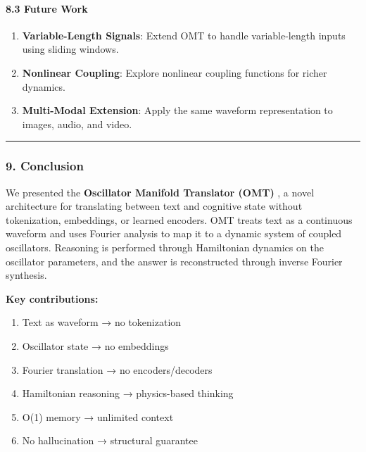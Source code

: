 \documentclass[
  11pt,
  a4paper,
]{article}
\providecommand{\tightlist}{%
  \setlength{\itemsep}{0pt}\setlength{\parskip}{0pt}}
\begin{document}
\paragraph{8.3 Future Work}\label{future-work-2}

\begin{enumerate}
\def\labelenumi{\arabic{enumi}.}
\tightlist
\item
  \textbf{Variable-Length Signals}: Extend OMT to handle variable-length
  inputs using sliding windows.
\item
  \textbf{Nonlinear Coupling}: Explore nonlinear coupling functions for
  richer dynamics.
\item
  \textbf{Multi-Modal Extension}: Apply the same waveform representation
  to images, audio, and video.
\end{enumerate}

\begin{center}\rule{0.5\linewidth}{0.5pt}\end{center}

\subsubsection{9. Conclusion}\label{conclusion-6}

We presented the \textbf{Oscillator Manifold Translator (OMT)} , a novel
architecture for translating between text and cognitive state without
tokenization, embeddings, or learned encoders. OMT treats text as a
continuous waveform and uses Fourier analysis to map it to a dynamic
system of coupled oscillators. Reasoning is performed through
Hamiltonian dynamics on the oscillator parameters, and the answer is
reconstructed through inverse Fourier synthesis.

\textbf{Key contributions:}

\begin{enumerate}
\def\labelenumi{\arabic{enumi}.}
\tightlist
\item
  Text as waveform → no tokenization
\item
  Oscillator state → no embeddings
\item
  Fourier translation → no encoders/decoders
\item
  Hamiltonian reasoning → physics-based thinking
\item
  O(1) memory → unlimited context
\item
  No hallucination → structural guarantee
\end{enumerate}
\end{document}

